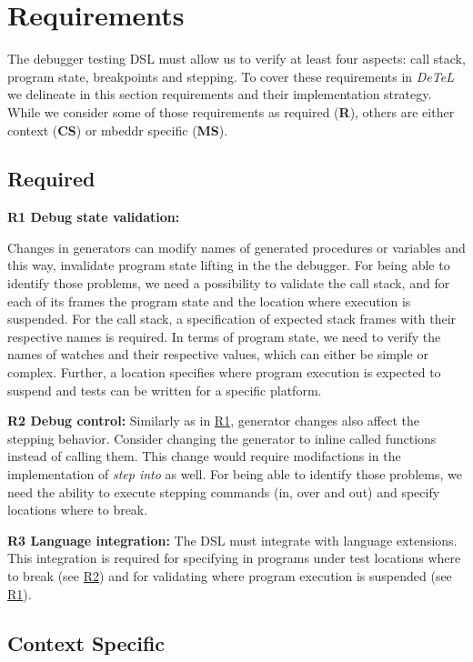 \section{Requirements}
\label{DesignDecisions}

The debugger testing \ac{DSL} must allow us to verify at least
four aspects: call stack, program state, breakpoints and stepping.
To cover these requirements in \emph{DeTeL} we delineate in this section
requirements and their implementation strategy. While we
consider some of those requirements as required (\textbf{R}), others are either
context (\textbf{CS}) or mbeddr specific (\textbf{MS}).

\subsection{Required}

\textbf{\label{R1}R1 Debug state validation:} 

Changes in generators can modify names of generated procedures or
variables and this way, \eg invalidate program state lifting in the the
debugger.
For being able to identify those problems, we need a  possibility to validate
the call stack, and for each of its frames the program state and the location where
execution is suspended. For the call stack,
a specification of expected stack frames with their respective names is
required. In terms of program state, we need to verify the names of watches 
and their respective values, which can either be simple
or complex. Further, a location specifies where program execution is
expected to suspend and tests can be written for a specific platform. 

\textbf{\label{R2}R2 Debug control:} Similarly as in \hyperref[R1]{R1},
generator changes also affect the stepping behavior. 
Consider changing the  generator to inline called
functions instead of calling them. This change would require modifactions in the
implementation of \emph{step into} as well. For being able to identify
those problems, we need the ability to execute stepping commands (in, over
and out) and specify locations where to break.

\textbf{\label{R3}R3 Language integration:} The
\ac{DSL} must integrate with language extensions.
This integration is required for specifying in programs under test
locations where to break (see \hyperref[R2]{R2}) and for validating where
program execution is suspended (see \hyperref[R1]{R1}).

\subsection{Context Specific}

